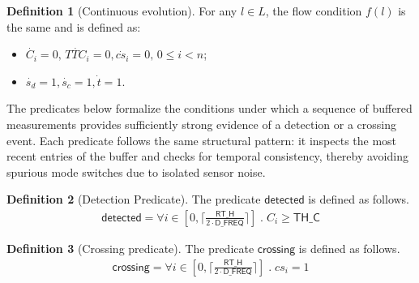 \documentclass[journal]{IEEEtran}
\theoremstyle{definition}
\newtheorem{definition}{Definition}
\theoremstyle{property}
\newcommand{\thr}[1]{\mathsf{#1}}
\newcommand{\detd}{\mathsf{detected}}
\newcommand{\cross}{\mathsf{crossing}}
\newcommand{\validD}{\mathsf{valid\_d}}
\newcommand{\validC}{\mathsf{valid\_c}}
\begin{document}
\begin{definition}[Continuous evolution]\label{def:continuous_dyn}
For any $l \in L$, the flow condition $f(l)$ is the same and is defined as:
\begin{itemize}
    \item $\dot{C_i} = 0, \, \dot{TTC_i} = 0, \dot{cs_i} = 0, \, 0 \leq i < n$;
    \item $\dot{s_d} = 1, \dot{s_c} = 1, \dot{t} = 1$.
\end{itemize}
\end{definition}

The predicates below formalize the conditions under which a sequence of 
buffered measurements provides sufficiently strong evidence of a detection or a crossing event. 
Each predicate follows the same structural pattern: it inspects the most recent entries of the 
buffer and checks for temporal consistency, thereby avoiding spurious mode switches due to isolated sensor noise. 

\begin{definition}[Detection Predicate]\label{def:app_det_p}
The predicate $\detd$ is defined as follows. 
    \[
        \begin{aligned}
                \detd = \forall i \in [0,\lceil \frac{\thr{RT\_H}}{2 \cdot \thr{D\_FREQ}} \rceil] \; . \; C_i \geq \thr{TH\_C}
        \end{aligned}
    \]
\end{definition}


\begin{definition}[Crossing predicate]\label{def:app_cross}
The predicate $\cross$ is defined as follows.
    \[
        \begin{aligned}
            \cross = \forall i \in [0,\lceil \frac{\thr{RT\_H}}{2 \cdot \thr{D\_FREQ}} \rceil ] \; . \; cs_i = 1
        \end{aligned}
    \]
\end{definition}


\end{document}
